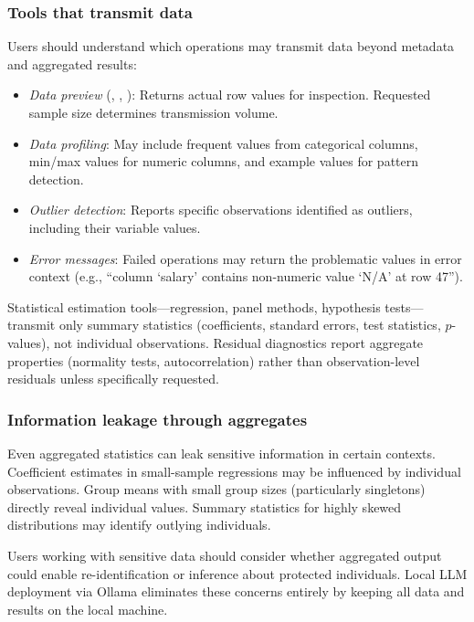 \subsubsection{Tools that transmit data}

Users should understand which operations may transmit data beyond
metadata and aggregated results:

\begin{itemize}
  \item \emph{Data preview} (, , ):
    Returns actual row values for inspection. Requested sample size
    determines transmission volume.
  \item \emph{Data profiling}: May include frequent values from categorical
    columns, min/max values for numeric columns, and example values for
    pattern detection.
  \item \emph{Outlier detection}: Reports specific observations identified
    as outliers, including their variable values.
  \item \emph{Error messages}: Failed operations may return the problematic
    values in error context (e.g., ``column `salary' contains non-numeric
    value `N/A' at row 47'').
\end{itemize}

Statistical estimation tools---regression, panel methods, hypothesis
tests---transmit only summary statistics (coefficients, standard errors,
test statistics, $p$-values), not individual observations. Residual
diagnostics report aggregate properties (normality tests, autocorrelation)
rather than observation-level residuals unless specifically requested.

\subsubsection{Information leakage through aggregates}

Even aggregated statistics can leak sensitive information in certain
contexts. Coefficient estimates in small-sample regressions may be
influenced by individual observations. Group means with small group
sizes (particularly singletons) directly reveal individual values.
Summary statistics for highly skewed distributions may identify
outlying individuals.

Users working with sensitive data should consider whether aggregated
output could enable re-identification or inference about protected
individuals. Local LLM deployment via Ollama eliminates these concerns
entirely by keeping all data and results on the local machine.

